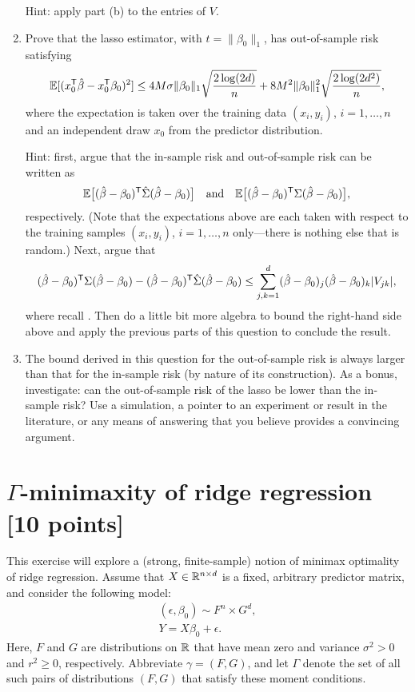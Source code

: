 \documentclass{article}
\begin{document}
\begin{enumerate}[label=(\alph*)]
  Hint: apply part (b) to the entries of $V$.

\item Prove that the lasso estimator, with $t=\|\beta_0\|_1$, has out-of-sample
  risk satisfying 
  \marginpar{\small [5 pts]}
  \[
  \mathbb{E}[(x_0^{\mathsf{T}} \hat{\beta} - x_0^{\mathsf{T}} \beta_0)^2] \leq 4M \sigma \|\beta_0\|_1
  \sqrt{\frac{2 \log(2d)}{n}} + 8 M^2 \|\beta_0\|_1^2 \sqrt{\frac{2
      \log(2d^2)}{n}},  
  \]
  where the expectation is taken over the training data $(x_i,y_i)$,
  $i=1,\dots,n$ and an independent draw $x_0$ from the predictor distribution. 

  Hint: first, argue that the in-sample risk and out-of-sample risk can be
  written as 
  \[
  \mathbb{E}\big[ (\hat{\beta}-\beta_0)^{\mathsf{T}} \hat\Sigma (\hat{\beta}-\beta_0) \big] 
  \quad \text{and} \quad
  \mathbb{E}\big[ (\hat{\beta}-\beta_0)^{\mathsf{T}} \Sigma (\hat{\beta}-\beta_0) \big],
  \]
  respectively. (Note that the expectations above are each taken with respect to
  the training samples $(x_i,y_i)$, $i=1,\dots,n$ only---there is nothing else
  that is random.) Next, argue that  
  \[
  (\hat{\beta}-\beta_0)^{\mathsf{T}} \Sigma (\hat{\beta}-\beta_0) -
  (\hat{\beta}-\beta_0)^{\mathsf{T}} \hat\Sigma (\hat{\beta}-\beta_0) 
  \leq \sum_{j,k=1}^d (\hat{\beta}-\beta_0)_j (\hat{\beta}-\beta_0)_k |V_{jk}|,
  \]
  where recall . Then do a little bit
  more algebra to bound the right-hand side above and apply the previous parts
  of this question to conclude the result. 

\item The bound derived in this question for the out-of-sample risk is always
  larger than that for the in-sample risk (by nature of its construction). As a
  bonus, investigate: can the out-of-sample risk of the lasso be lower than the
  in-sample risk? Use a simulation, a pointer to an experiment or result in the
  literature, or any means of answering that you believe provides a convincing 
  argument.   
\end{enumerate}

\section{$\Gamma$-minimaxity of ridge regression [10 points]} 

\def\Risk{\mathrm{Risk}}

This exercise will explore a (strong, finite-sample) notion of minimax
optimality of ridge regression. Assume that $X \in \mathbb{R}^{n \times d}$ is a fixed,
arbitrary predictor matrix, and consider the following model:  
\begin{equation}
\label{eq:model}
\begin{gathered}
(\epsilon, \beta_0) \sim F^n \times G^d, \\
Y = X\beta_0 + \epsilon.
\end{gathered}
\end{equation}
Here, $F$ and $G$ are distributions on $\mathbb{R}$ that have mean zero and variance
$\sigma^2 > 0$ and $r^2 \geq 0$, respectively. Abbreviate $\gamma = (F,G)$, and 
let $\Gamma$ denote the set of all such pairs of distributions $(F,G)$ that
satisfy these moment conditions. 
\end{document}
